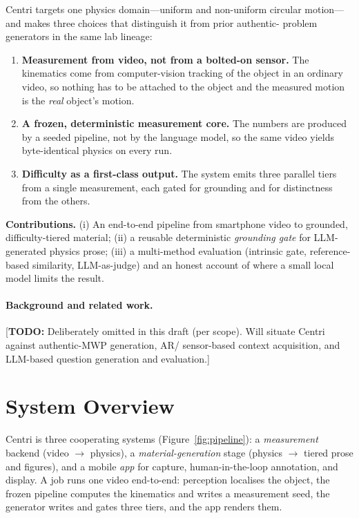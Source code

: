 \documentclass[11pt]{article}
\newcommand{\todo}[1]{{\color{red}[\textbf{TODO:} #1]}}
\begin{document}
Centri targets one physics domain---uniform and non-uniform circular
motion---and makes three choices that distinguish it from prior authentic-%
problem generators in the same lab lineage:
\begin{enumerate}
  \item \textbf{Measurement from video, not from a bolted-on sensor.} The
  kinematics come from computer-vision tracking of the object in an ordinary
  video, so nothing has to be attached to the object and the measured motion is
  the \emph{real} object's motion.
  \item \textbf{A frozen, deterministic measurement core.} The numbers are
  produced by a seeded pipeline, not by the language model, so the same video
  yields byte-identical physics on every run.
  \item \textbf{Difficulty as a first-class output.} The system emits three
  parallel tiers from a single measurement, each gated for grounding and for
  distinctness from the others.
\end{enumerate}

\noindent\textbf{Contributions.} (i) An end-to-end pipeline from smartphone
video to grounded, difficulty-tiered material; (ii) a reusable deterministic
\emph{grounding gate} for LLM-generated physics prose; (iii) a multi-method
evaluation (intrinsic gate, reference-based similarity, LLM-as-judge) and an
honest account of where a small local model limits the result.

\paragraph{Background and related work.} \todo{Deliberately omitted in this
draft (per scope). Will situate Centri against authentic-MWP generation, AR/%
sensor-based context acquisition, and LLM-based question generation and
evaluation.}

\section{System Overview}
Centri is three cooperating systems (Figure~\ref{fig:pipeline}): a
\emph{measurement} backend (video $\rightarrow$ physics), a
\emph{material-generation} stage (physics $\rightarrow$ tiered prose and
figures), and a mobile \emph{app} for capture, human-in-the-loop annotation,
and display. A job runs one video end-to-end: perception localises the object,
the frozen pipeline computes the kinematics and writes a measurement seed, the
generator writes and gates three tiers, and the app renders them.
\end{document}
